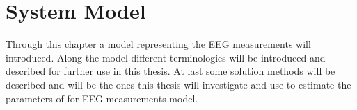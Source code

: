 \chapter{System Model}
Through this chapter a model representing the EEG measurements will introduced. Along the model different terminologies will be introduced and described for further use in this thesis. At last some solution methods will be described and will be the ones this thesis will investigate and use to estimate the parameters of for EEG measurements model.
    


